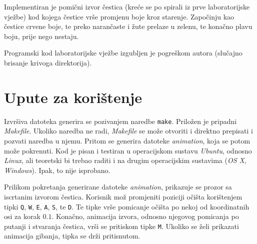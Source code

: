 \documentclass[10pt,a4paper]{article}
\begin{document}
Implementiran je pomi\v{c}ni izvor \v{c}estica (kre\'{c}e se po spirali iz prve laboratorijske vje\v{z}be) kod kojega \v{c}estice vr\v{s}e promjenu boje kroz starenje. Zapo\v{c}inju kao \v{c}estice crvene boje, te preko naran\v{c}aste i \v{z}ute prelaze u zelenu, te kona\v{c}no plavu boju, prije nego nestaju.

Programski kod laboratorijske vje\v{z}be izgubljen je pogre\v{s}kom autora (slu\v{c}ajno brisanje krivoga direktorija).

\section{Upute za kori\v{s}tenje}

Izvr\v{s}iva datoteka generira se pozivanjem naredbe \texttt{make}. Prilo\v{z}en je pripadni \emph{Makefile}. Ukoliko naredba ne radi, \emph{Makefile} se mo\v{z}e otvoriti i direktno prepisati i pozvati naredba u njemu. Pritom se generira datoteke \emph{animation}, koja se potom mo\v{z}e pokrenuti. Kod je pisan i testiran u operacijskom sustavu \emph{Ubuntu}, odnosno \emph{Linux}, ali teoretski bi trebao raditi i na drugim operacijskim sustavima (\emph{OS X}, \emph{Windows}). Ipak, to nije isprobano.

Prilikom pokretanja generirane datoteke \emph{animation}, prikazuje se prozor sa iscrtanim izvorom \v{c}estica. Korisnik mo\v{z} promjeniti poziciji o\v{c}i\v{s}ta kori\v{s}tenjem tipki \texttt{Q}, \texttt{W}, \texttt{E}, \texttt{A}, \texttt{S}, te \texttt{D}. Te tipke vr\v{s}e pomicanje o\v{c}i\v{s}ta po nekoj od koordinatnih osi za korak $0.1$. Kona\v{c}no, animacija izvora, odnosno njegovog pomicanja po putanji i stvaranja \v{c}estica, vr\v{s}i se pritiskom tipke \texttt{M}. Ukoliko se \v{z}eli prikazati animacija gibanja, tipka se dr\v{z}i pritisnutom.
\end{document}
